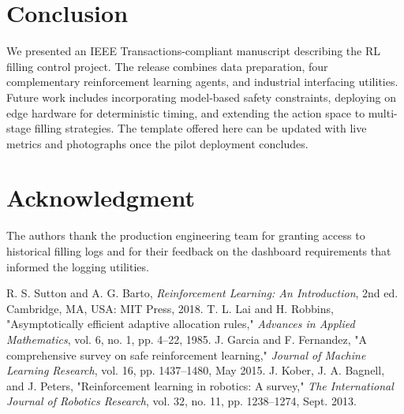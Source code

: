 \documentclass[journal]{IEEEtranTIE}
\begin{document}
\section{Conclusion}
We presented an IEEE Transactions-compliant manuscript describing the RL filling control project. The release combines data preparation, four complementary reinforcement learning agents, and industrial interfacing utilities. Future work includes incorporating model-based safety constraints, deploying on edge hardware for deterministic timing, and extending the action space to multi-stage filling strategies. The template offered here can be updated with live metrics and photographs once the pilot deployment concludes.

\section*{Acknowledgment}
The authors thank the production engineering team for granting access to historical filling logs and for their feedback on the dashboard requirements that informed the logging utilities.

\begin{thebibliography}{00}
 R. S. Sutton and A. G. Barto, \emph{Reinforcement Learning: An Introduction}, 2nd ed. Cambridge, MA, USA: MIT Press, 2018.
 T. L. Lai and H. Robbins, "Asymptotically efficient adaptive allocation rules," \emph{Advances in Applied Mathematics}, vol. 6, no. 1, pp. 4--22, 1985.
 J. Garcia and F. Fernandez, "A comprehensive survey on safe reinforcement learning," \emph{Journal of Machine Learning Research}, vol. 16, pp. 1437--1480, May 2015.
 J. Kober, J. A. Bagnell, and J. Peters, "Reinforcement learning in robotics: A survey," \emph{The International Journal of Robotics Research}, vol. 32, no. 11, pp. 1238--1274, Sept. 2013.
\end{thebibliography}
\end{document}
